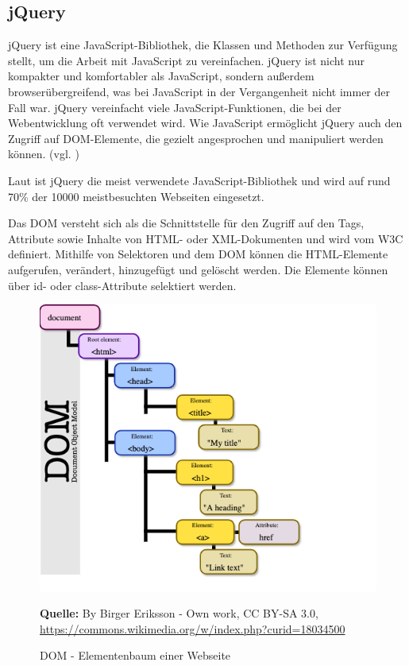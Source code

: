 \subsection{jQuery}
\label{sec:jQuery}
jQuery ist eine JavaScript-Bibliothek, die Klassen und Methoden zur Verfügung stellt, um die Arbeit mit JavaScript zu vereinfachen. jQuery ist nicht nur kompakter und komfortabler als JavaScript, sondern außerdem browserübergreifend, was bei JavaScript in der Vergangenheit nicht immer der Fall war. jQuery vereinfacht viele JavaScript-Funktionen, die bei der Webentwicklung oft verwendet wird. Wie JavaScript ermöglicht jQuery auch den Zugriff auf DOM-Elemente, die gezielt angesprochen und manipuliert werden können. (vgl. \cite{Ste2019})\bigskip

Laut \cite{Wiki2019b} ist jQuery die meist verwendete JavaScript-Bibliothek und wird auf rund 70\% der 10000 meistbesuchten Webseiten eingesetzt.\bigskip

Das DOM versteht sich als die Schnittstelle für den Zugriff auf den Tags, Attribute sowie Inhalte von HTML- oder XML-Dokumenten und wird vom W3C definiert. Mithilfe von Selektoren und dem DOM können die HTML-Elemente aufgerufen, verändert, hinzugefügt und gelöscht werden. Die Elemente können über id- oder class-Attribute selektiert werden. 

\begin{figure}[H]
  \begin{center}
    \includegraphics[scale=0.5]{img/dom}
	\caption{DOM - Elementenbaum einer Webseite}
	\footnotesize\sffamily\textbf{Quelle:} By Birger Eriksson - Own work, CC BY-SA 3.0, \url{https://commons.wikimedia.org/w/index.php?curid=18034500} 
	\label{fig:dom}
  \end{center}   
\end{figure}


